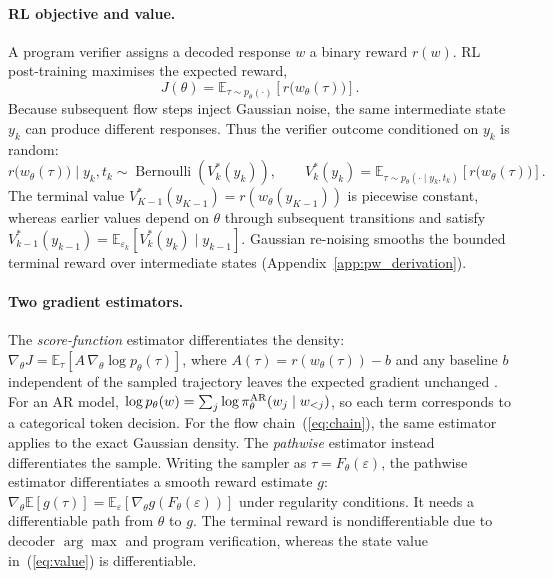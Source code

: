 \paragraph{RL objective and value.}
A program verifier assigns a decoded response $w$ a binary reward $r(w)$. RL post-training maximises the expected reward,
\begin{equation}
J(\theta)
=
\mathbb E_{\tau\sim p_\theta(\cdot)}
\left[
r\bigl(w_\theta(\tau)\bigr)
\right].
\label{eq:objective}
\end{equation}
Because subsequent flow steps inject Gaussian noise, the same intermediate state $y_k$ can produce different responses. Thus the verifier outcome conditioned on $y_k$ is random:
\begin{equation}
r\bigl(w_\theta(\tau)\bigr) \mid y_k, t_k
\sim
\operatorname{Bernoulli}\!\left(V_k^*(y_k)\right),
\qquad
V_k^*(y_k)
=
\mathbb E_{\tau\sim p_\theta(\cdot\mid y_k,t_k)}
\!\left[r\bigl(w_\theta(\tau)\bigr)\right].
\label{eq:value}
\end{equation}
The terminal value $V_{K-1}^*(y_{K-1})=r(w_\theta(y_{K-1}))$ is piecewise constant, whereas earlier values depend on $\theta$ through subsequent transitions and satisfy $V_{k-1}^*(y_{k-1})=\mathbb E_{\varepsilon_k} \left[V_k^*(y_k)\mid y_{k-1}\right]$. Gaussian re-noising smooths the bounded terminal reward over intermediate states (Appendix~\ref{app:pw_derivation}).

\paragraph{Two gradient estimators.}
The \emph{score-function} estimator differentiates the density: $\nabla_\theta J=\mathbb E_\tau[A\,\nabla_\theta\log p_\theta(\tau)]$, where $A(\tau)=r(w_\theta(\tau))-b$ and any baseline $b$ independent of the sampled trajectory leaves the expected gradient unchanged \citep{williams1992reinforce}. For an AR model, $\log p_\theta(w)=\sum_j\log\pi^{\rm AR}_\theta(w_j\mid w_{<j})$, so each term corresponds to a categorical token decision. For the flow chain~(\ref{eq:chain}), the same estimator applies to the exact Gaussian density. The \emph{pathwise} estimator instead differentiates the sample. Writing the sampler as $\tau=F_\theta(\varepsilon)$, the pathwise estimator differentiates a smooth reward estimate $g$: $\nabla_\theta\mathbb E[g(\tau)]=\mathbb E_\varepsilon[\nabla_\theta g(F_\theta(\varepsilon))]$ under regularity conditions. It needs a differentiable path from $\theta$ to $g$. The terminal reward is nondifferentiable due to decoder $\arg\max$ and program verification, whereas the state value in~(\ref{eq:value}) is differentiable.
